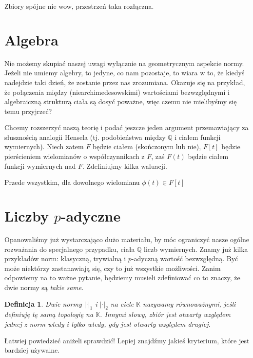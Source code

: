 \documentclass[a4paper,fleqn,9pt]{extarticle}
\newtheorem{dff}{Definicja}
\begin{document}
Zbiory spójne nie wow, przestrzeń taka rozłączna.

\section{Algebra}
Nie możemy skupiać naszej uwagi wyłącznie na geometrycznym aspekcie normy. Jeżeli nie umiemy algebry, to jedyne, co nam pozostaje, to wiara w to, że kiedyś nadejdzie taki dzień, że zostanie przez nas zrozumiana. Okazuje się na przykład, że połączenia między (niearchimedesowskimi) wartościami bezwzględnymi i algebraiczną strukturą ciała są dosyć poważne, więc czemu nie mielibyśmy się temu przyjrzeć?

Chcemy rozszerzyć naszą teorię i podać jeszcze jeden argument przemawiający za słusznością analogii Hensela (tj. podobieństwa między $\mathbb Q$ i ciałem funkcji wymiernych). Niech zatem $F$ będzie ciałem (skończonym lub nie), $F[t]$ będzie pierścieniem wielomianów o współczynnikach z $F$, zaś $F(t)$ będzie ciałem funkcji wymiernych nad $F$. Zdefiniujmy kilka waluacji.

Przede wszystkim, dla dowolnego wielomianu $\phi(t) \in F[t]$

\section{Liczby $p$-adyczne}
Opanowaliśmy już wystarczająco dużo materiału, by móc ograniczyć nasze ogólne rozważania do specjalnego przypadku, ciała $\mathbb Q$ liczb wymiernych. Znamy już kilka przykładów norm: klasyczną, trywialną i $p$-adyczną wartość bezwzględną. Być może niektórzy zastanawiają się, czy to już wszystkie możliwości. Zanim odpowiemy na to ważne pytanie, będziemy musieli zdefiniować co to znaczy, że dwie normy są \emph{takie same}.

\begin{dff}Dwie normy $|\cdot|_1$ i $|\cdot|_2$ na ciele $\mathbb K$ nazywamy równoważnymi, jeśli definiuję tę samą topologię na $\mathbb K$. Innymi słowy, zbiór jest otwarty względem jednej z norm wtedy i tylko wtedy, gdy jest otwarty względem drugiej.\end{dff}

Łatwiej powiedzieć aniżeli sprawdzić! Lepiej znajdźmy jakieś kryterium, które jest bardziej używalne.
\end{document}
